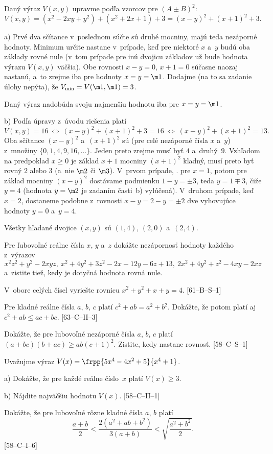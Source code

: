 {%
Daný výraz $V(x,y)$ upravme podľa vzorcov pre $(A\pm B)^2$:
$$
V(x,y)=\left(x^{2}-2xy+y^{2}\right)+\left(x^{2}+2x+1\right)+3=
\left(x-y\right)^{2}+\left(x+1\right)^{2}+3.
$$

\smallskip
a) Prvé dva sčítance v~poslednom súčte sú druhé mocniny, majú teda
nezáporné hodnoty. Minimum určite nastane v~prípade,
keď pre niektoré $x$ a~$y$ budú oba základy rovné nule (v~tom
prípade pre inú dvojicu základov už bude hodnota výrazu $V(x,y)$ väčšia).
Obe rovnosti $x-y=0$, $x+1=0$ súčasne
naozaj nastanú, a~to zrejme iba pre hodnoty $x=y=\m1$.
Dodajme (na to sa zadanie úlohy nepýta),
že $V_{\min}=V(\m1,\m1)=3$.

\odpoved
Daný výraz nadobúda svoju najmenšiu hodnotu iba pre
$x=y=\m1$.

\smallskip
b) Podľa úpravy z~úvodu riešenia platí
$$
V(x,y)=16\ \Leftrightarrow\ (x-y)^{2}+(x+1)^{2}+3=16
\ \Leftrightarrow\ (x-y)^{2}+(x+1)^{2}=13.
$$
Oba sčítance $(x-y)^2$ a~$(x+1)^2$ sú (pre celé nezáporné čísla
$x$ a~$y$) z~množiny $\{0, 1, 4, 9, 16,\dots\}$.
Jeden preto zrejme musí byť $4$ a~druhý~$9$. Vzhľadom na predpoklad
$x\ge0$ je základ $x+1$ mocniny $(x+1)^2$ kladný,
musí preto byť rovný $2$
alebo $3$ (a~nie $\m2$ či $\m3$).
V~prvom prípade, \tj. pre $x=1$, potom pre základ mocniny $(x-y)^2$
dostávame podmienku $1-y=\pm3$, teda $y=1\mp3$, čiže $y=4$
(hodnota $y=\m2$ je zadaním časti~b) vylúčená). V~druhom prípade,
keď $x=2$, dostaneme podobne z~rovnosti $x-y=2-y=\pm2$
dve vyhovujúce hodnoty $y=0$ a~$y=4$.

\odpoved
Všetky hľadané dvojice $(x,y)$ sú $(1, 4)$, $(2, 0)$ a~$(2, 4)$.



Pre ľubovoľné reálne čísla $x$, $y$ a~$z$ dokážte
nezápornosť hodnoty každého z~výrazov
$$
x^2z^2+y^2-2xyz,\
x^2+4y^2+3z^2-2x-12y-6z+13,\
2x^2+4y^2+z^2-4xy-2xz
$$
a~zistite tiež, kedy je dotyčná hodnota rovná nule.

\D
V~obore celých čísel vyriešte rovnicu $x^2+y^2+x+y=4$. [61--B--S--1]

Pre kladné reálne čísla $a$, $b$, $c$ platí $c^2 + ab = a^2 + b^2$. Dokážte, že potom platí aj
$c^2 + ab \le ac + bc$. [63--C--II--3]

Dokážte, že pre ľubovoľné nezáporné čísla $a$, $b$, $c$ platí
$(a+bc)(b+ac)\ge ab(c+1)^2$.
Zistite, kedy nastane rovnosť. [58--C--S--1]

Uvažujme výraz
$V(x)=\frpp{5x^{4}-4x^{2}+5}{x^{4}+1}$.
\item{a)} Dokážte, že pre každé reálne číslo~$x$ platí $V(x)\ge3$.
\item{b)} Nájdite najväčšiu hodnotu $V(x)$.
[58--C--II--1]

Dokážte, že pre ľubovoľné rôzne kladné čísla $a$, $b$ platí
$$
\frac{a+b}{2}<\frac{2(a^2+ab+b^2)}{3(a+b)}<\sqrt{\frac{a^2+b^2}{2}}.
$$
[58--C--I--6]
}

